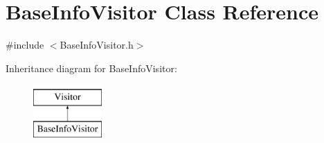 \hypertarget{classBaseInfoVisitor}{}\section{Base\+Info\+Visitor Class Reference}
\label{classBaseInfoVisitor}


{\ttfamily \#include $<$Base\+Info\+Visitor.\+h$>$}

Inheritance diagram for Base\+Info\+Visitor\+:\begin{figure}[H]
\begin{center}
\leavevmode
\includegraphics[height=2.000000cm]{classBaseInfoVisitor}
\end{center}
\end{figure}
